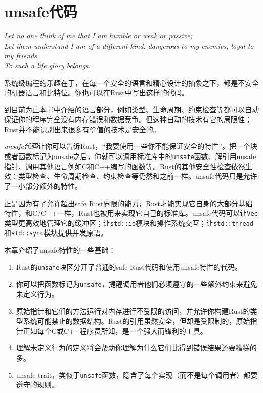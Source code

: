 \chapter{unsafe代码}\label{ch22}

\emph{Let no one think of me that I am humble or weak or passive; \\
Let them understand I am of a diﬀerent kind: dangerous to my enemies, loyal to my friends. \\
To such a life glory belongs.}

系统级编程的乐趣在于，在每一个安全的语言和精心设计的抽象之下，都是不安全的机器语言和比特位。你也可以在Rust中写出这样的代码。

到目前为止本书中介绍的语言部分，例如类型、生命周期、约束检查等都可以自动保证你的程序完全没有内存错误和数据竞争。但这种自动的技术有它的局限性；Rust并不能识别出来很多有价值的技术是安全的。

\emph{unsafe代码}让你可以告诉Rust，“我要使用一些你不能保证安全的特性”。把一个块或者函数标记为unsafe之后，你就可以调用标准库中的\texttt{unsafe}函数、解引用unsafe指针、调用其他语言例如C和C++编写的函数等。Rust的其他安全性检查依然生效：类型检查、生命周期检查、约束检查等仍然和之前一样。unsafe代码只是允许了一小部分额外的特性。

正是因为有了允许超出safe Rust界限的能力，Rust才能实现它自身的大部分基础特性，和C/C++一样，Rust也被用来实现它自己的标准库。unsafe代码可以让\texttt{Vec}类型更高效地管理它的缓冲区；让\texttt{std::io}模块和操作系统交互；让\texttt{std::thread}和\texttt{std::sync}模块提供并发原语。

本章介绍了unsafe特性的一些基础：

\begin{enumerate}
    \item Rust的\texttt{unsafe}块区分开了普通的safe Rust代码和使用unsafe特性的代码。
    \item 你可以把函数标记为\texttt{unsafe}，提醒调用者他们必须遵守的一些额外约束来避免未定义行为。
    \item 原始指针和它们的方法运行对内存进行不受限的访问，并允许你构建Rust的类型系统可能禁止的数据结构。Rust的引用虽然安全，但却是受限制的，原始指针正如每个C或C++程序员所知，是一个强大而锋利的工具。
    \item 理解未定义行为的定义将会帮助你理解为什么它们比得到错误结果还要糟糕的多。
    \item unsafe trait，类似于\texttt{unsafe}函数，隐含了每个实现（而不是每个调用者）都要遵守的规则。
\end{enumerate}

